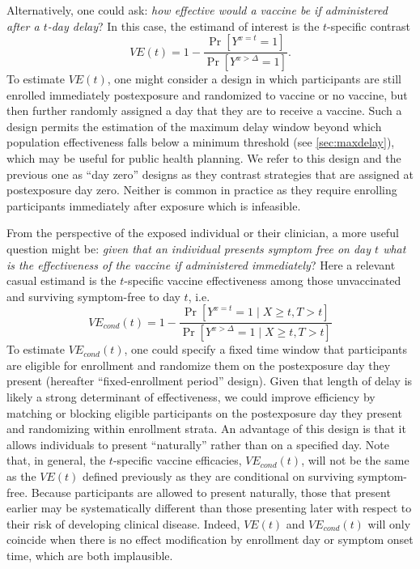 \documentclass[11pt]{article}
\begin{document}
Alternatively, one could ask: \textit{how effective would a vaccine be if administered after a $t$-day delay}? In this case, the estimand of interest is the $t$-specific contrast
\begin{equation}
VE(t) = 1 - \frac{\Pr[Y^{x = t} = 1]}{\Pr[Y^{x > \Delta} = 1]}.
\end{equation}
To estimate $VE(t)$, one might consider a design in which participants are still enrolled immediately postexposure and randomized to vaccine or no vaccine, but then further randomly assigned a day that they are to receive a vaccine. Such a design permits the estimation of the maximum delay window beyond which population effectiveness falls below a minimum threshold (see \ref{sec:maxdelay}), which may be useful for public health planning. We refer to this design and the previous one as ``day zero'' designs as they contrast strategies that are assigned at postexposure day zero. Neither is common in practice as they require enrolling participants immediately after exposure which is infeasible.

From the perspective of the exposed individual or their clinician, a more useful question might be: \textit{given that an individual presents symptom free on day $t$ what is the effectiveness of the vaccine if administered immediately}? Here a relevant casual estimand is the $t$-specific vaccine effectiveness among those unvaccinated and surviving symptom-free to day $t$, i.e.
\begin{equation}
  VE_{cond}(t) = 1 - \frac{\Pr[Y^{x = t} = 1 \mid X \geq t, T > t]}{\Pr[Y^{x > \Delta} = 1 \mid X \geq t, T > t]}
\end{equation}
To estimate $VE_{cond}(t)$, one could specify a fixed time window that participants are eligible for enrollment and randomize them on the postexposure day they present (hereafter ``fixed-enrollment period'' design). Given that length of delay is likely a strong determinant of effectiveness, we could improve efficiency by matching or blocking eligible participants on the postexposure day they present and randomizing within enrollment strata. An advantage of this design is that it allows individuals to present ``naturally'' rather than on a specified day. Note that, in general, the $t$-specific vaccine efficacies, $VE_{cond}(t)$, will not be the same as the $VE(t)$ defined previously as they are conditional on surviving symptom-free. Because participants are allowed to present naturally, those that present earlier may be systematically different than those presenting later with respect to their risk of developing clinical disease. Indeed, $VE(t)$ and $VE_{cond}(t)$ will only coincide when there is no effect modification by enrollment day or symptom onset time, which are both implausible.
\end{document}
